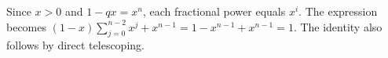 Since $x>0$ and $1-qx=x^n$, each fractional power equals $x^i$. The expression becomes $(1-x)\sum_{j=0}^{n-2}x^j+x^{n-1}=1-x^{n-1}+x^{n-1}=\boxed1$. The identity also follows by direct telescoping.
